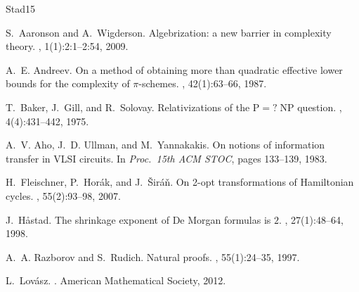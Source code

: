 \documentclass[11pt]{article}
\begin{document}

\begin{thebibliography}{Stad15}

S.~Aaronson and A.~Wigderson.
\newblock Algebrization: a new barrier in complexity theory.
, 1(1):2:1--2:54, 2009.

A.~E. Andreev.
\newblock On a method of obtaining more than quadratic effective lower bounds
  for the complexity of $\pi$-schemes.
, 42(1):63--66, 1987.

T.~Baker, J.~Gill, and R.~Solovay.
\newblock Relativizations of the {$\mathrm{P} =\!?\; \mathrm{NP}$} question.
, 4(4):431--442, 1975.

A.~V. Aho, J.~D. Ullman, and M.~Yannakakis.
\newblock On notions of information transfer in {VLSI} circuits.
\newblock In {\em Proc.\ 15th ACM STOC}, pages 133--139, 1983.

H.~Fleischner, P.~Hor{\'a}k, and J.~\v{S}ir{\'a}\v{n}.
\newblock On 2-opt transformations of Hamiltonian cycles.
, 55(2):93--98, 2007.

J.~H{\aa}stad.
\newblock The shrinkage exponent of {D}e {M}organ formulas is $2$.
, 27(1):48--64, 1998.

A.~A. Razborov and S.~Rudich.
\newblock Natural proofs.
, 55(1):24--35, 1997.

L.~Lov{\'a}sz.
.
\newblock American Mathematical Society, 2012.

\end{thebibliography}
\end{document}
